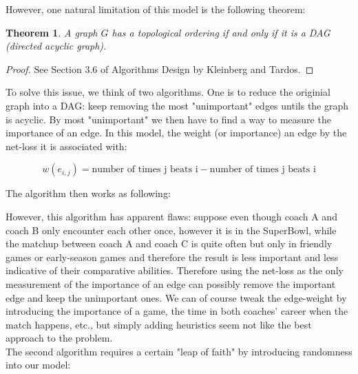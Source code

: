 \documentclass[titlepage]{article}
\newtheorem{theorem}{Theorem}[section]
\begin{document}
\noindent However, one natural limitation of this model is the following theorem:

\begin{theorem}
A graph $G$ has a topological ordering if and only if it is a DAG (directed acyclic graph).
\end{theorem}
\begin{proof}
See Section 3.6 of Algorithms Design by Kleinberg and Tardos.
\end{proof}

\noindent To solve this issue, we think of two algorithms. One is to reduce the originial graph into a DAG: keep removing the most "unimportant" edges untils the graph is acyclic. By most "unimportant" we then have to find a way to measure the importance of an edge. In this model, the weight (or importance) an edge by the net-loss it is associated with:

$$w(e_{i, j}) = \mbox{number of times j beats i} - \mbox{number of times j beats i}$$

\noindent The algorithm then works as following:

\vspace{5mm}


\vspace{5mm}

\noindent However, this algorithm has apparent flaws: suppose even though coach A and coach B only encounter each other once, however it is in the SuperBowl, while the matchup between coach A and coach C is quite often but only in friendly games or early-season games and therefore the result is less important and less indicative of their comparative abilities. Therefore using the net-loss as the only measurement of the importance of an edge can possibly remove the important edge and keep the unimportant ones. We can of course tweak the edge-weight by introducing the importance of a game, the time in both coaches' career when the match happens, etc., but simply adding heuristics seem not like the best approach to the problem.
\\

\noindent The second algorithm requires a certain "leap of faith" by introducing randomness into our model:
\end{document}
